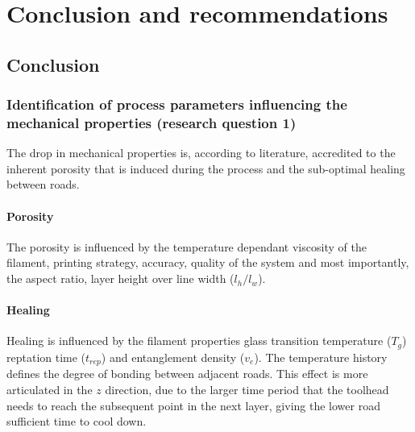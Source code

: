 \chapter{Conclusion and recommendations}
\label{chp:8}

\section{Conclusion}
%

\subsection{Identification of process parameters influencing the mechanical properties (research question 1)}
The drop in mechanical properties is, according to literature, accredited to the inherent porosity that is induced during the process and the sub-optimal healing between roads. 

\subsubsection{Porosity} 
The porosity is influenced by the temperature dependant viscosity of the filament, printing strategy, accuracy, quality of the system and most importantly, the aspect ratio, layer height over line width ($l_h/l_w$). 

\subsubsection{Healing} 
Healing is influenced by the filament properties glass transition temperature ($T_g$) reptation time ($t_{rep}$) and entanglement density ($v_e$). The temperature history defines the degree of bonding between adjacent roads. This effect is more articulated in the $z$ direction, due to the larger time period that the toolhead needs to reach the subsequent point in the next layer, giving the lower road sufficient time to cool down. 

